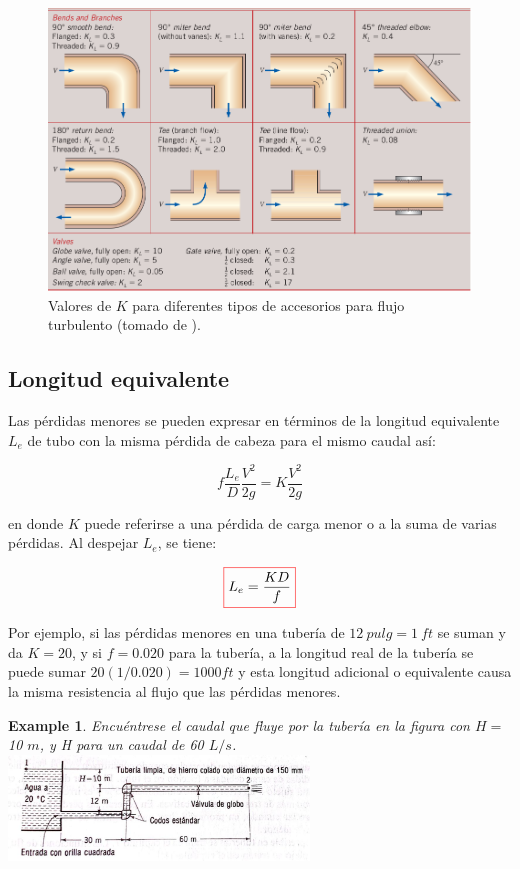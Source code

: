 \documentclass[11pt, oneside]{article}
\newtheorem{exa}{Example}
\begin{document}
\begin{figure}[h]
\centering
\includegraphics[width=\textwidth]{acce4.png}
\caption{Valores de $K$ para diferentes tipos de accesorios para flujo turbulento (tomado de \cite{cengel2013ebook}).}
\label{acce4}
\end{figure}

\subsection{Longitud equivalente} %
Las p\'erdidas menores se pueden expresar en t\'erminos de la longitud equivalente $L_e$ de tubo con la misma p\'erdida de cabeza para el mismo caudal as\'i:

\begin{equation}
f \frac{L_e }{D} \frac{V^2}{2g} = K \frac{V^2}{2g}
\label{perm11}
\end{equation}

en donde $K$ puede referirse a una p\'erdida de carga menor o a la suma de varias p\'erdidas. Al despejar $L_e$, se tiene:

\begin{equation}
\color{red}\boxed{\color{black} L_e = \frac{KD}{f} }
\label{perm12}
\end{equation}

Por ejemplo, si las p\'erdidas menores en una tuber\'ia de $12\ pulg = 1\ ft$ se suman y da $K=20$, y si $f = 0.020$ para la tuber\'ia, a la longitud real de la tuber\'ia se puede sumar $20(1/0.020)=1000 ft$ y esta longitud adicional o equivalente causa la misma resistencia al flujo que las p\'erdidas menores. 

\begin{shaded}
\begin{exa}
Encu\'entrese el caudal que fluye por la tuber\'ia en la figura con $H =$ 10 $m$, y H para un caudal de 60 $L/s$.
\includegraphics[width=8cm]{exa20.jpeg}
\end{exa}
\end{shaded}
\end{document}
